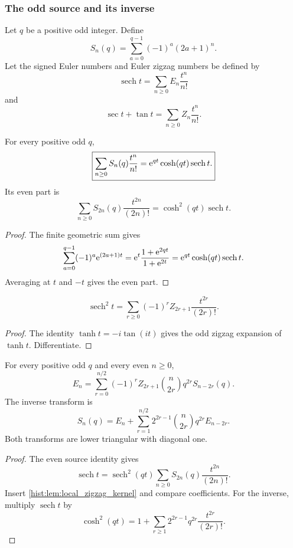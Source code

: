\subsubsection{The odd source and its inverse}

Let \(q\) be a positive odd integer. Define
\[
S_n(q)
=
\sum_{a=0}^{q-1}
(-1)^a(2a+1)^n.
\]
Let the signed Euler numbers and Euler zigzag numbers be defined by
\[
\operatorname{sech}t
=
\sum_{n\geq0}E_n\frac{t^n}{n!}
\]
and
\[
\sec t+\tan t
=
\sum_{n\geq0}Z_n\frac{t^n}{n!}.
\]

\begin{histlemma}\label{hist:lem:odd_source_egf}
For every positive odd \(q\),
\[
\boxed{
\sum_{n\geq0}S_n(q)\frac{t^n}{n!}
=
\mathrm e^{qt}\cosh(qt)\operatorname{sech}t.
}
\]
Its even part is
\[
\boxed{
\sum_{n\geq0}S_{2n}(q)\frac{t^{2n}}{(2n)!}
=
\cosh^2(qt)\operatorname{sech}t.
}
\]
\end{histlemma}

\begin{proof}
The finite geometric sum gives
\[
\sum_{a=0}^{q-1}(-1)^a\mathrm e^{(2a+1)t}
=
\mathrm e^t\frac{1+\mathrm e^{2qt}}{1+\mathrm e^{2t}}
=
\mathrm e^{qt}\cosh(qt)\operatorname{sech}t.
\]
Averaging at \(t\) and \(-t\) gives the even part.
\end{proof}

\begin{histlemma}\label{hist:lem:local_zigzag_kernel}
\[
\boxed{
\operatorname{sech}^2t
=
\sum_{r\geq0}
(-1)^rZ_{2r+1}
\frac{t^{2r}}{(2r)!}.
}
\]
\end{histlemma}

\begin{proof}
The identity \(\tanh t=-i\tan(it)\) gives the odd zigzag expansion of \(\tanh t\). Differentiate.
\end{proof}

\begin{histtheorem}\label{hist:thm:odd_coordinate_pair}
For every positive odd \(q\) and every even \(n\geq0\),
\[
\boxed{
E_n
=
\sum_{r=0}^{n/2}
(-1)^rZ_{2r+1}
\binom n{2r}
q^{2r}S_{n-2r}(q).
}
\]
The inverse transform is
\[
\boxed{
S_n(q)
=
E_n
+
\sum_{r=1}^{n/2}
2^{2r-1}
\binom n{2r}
q^{2r}E_{n-2r}.
}
\]
Both transforms are lower triangular with diagonal one.
\end{histtheorem}

\begin{proof}
The even source identity gives
\[
\operatorname{sech}t
=
\operatorname{sech}^2(qt)
\sum_{n\geq0}S_{2n}(q)\frac{t^{2n}}{(2n)!}.
\]
Insert \cref{hist:lem:local_zigzag_kernel} and compare coefficients. For the inverse, multiply \(\operatorname{sech}t\) by
\[
\cosh^2(qt)
=
1+
\sum_{r\geq1}2^{2r-1}q^{2r}\frac{t^{2r}}{(2r)!}.
\]
\end{proof}

